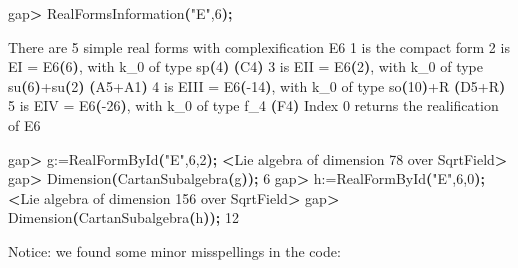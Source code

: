 \documentclass[
]{article}
\newenvironment{Shaded}{\begin{snugshade}}{\end{snugshade}}
\newcommand{\ErrorTok}[1]{\textcolor[rgb]{0.64,0.00,0.00}{\textbf{#1}}}
\newcommand{\ExtensionTok}[1]{#1}
\newcommand{\KeywordTok}[1]{\textcolor[rgb]{0.13,0.29,0.53}{\textbf{#1}}}
\newcommand{\NormalTok}[1]{#1}
\newcommand{\OperatorTok}[1]{\textcolor[rgb]{0.81,0.36,0.00}{\textbf{#1}}}
\newcommand{\StringTok}[1]{\textcolor[rgb]{0.31,0.60,0.02}{#1}}
\begin{document}
\begin{Shaded}
\begin{Highlighting}[]
\ExtensionTok{gap}\OperatorTok{\textgreater{}}\NormalTok{ RealFormsInformation}\ErrorTok{(}\StringTok{"E"}\ExtensionTok{,6}\KeywordTok{);}

  \ExtensionTok{There}\NormalTok{ are 5 simple real forms with complexification E6}
    \ExtensionTok{1}\NormalTok{ is the compact form}
    \ExtensionTok{2}\NormalTok{ is EI   = E6}\ErrorTok{(}\ExtensionTok{6}\KeywordTok{)}\ExtensionTok{,}\NormalTok{ with k\_0 of type sp}\ErrorTok{(}\ExtensionTok{4}\KeywordTok{)} \KeywordTok{(}\ExtensionTok{C4}\KeywordTok{)}
    \ExtensionTok{3}\NormalTok{ is EII  = E6}\ErrorTok{(}\ExtensionTok{2}\KeywordTok{)}\ExtensionTok{,}\NormalTok{ with k\_0 of type su}\ErrorTok{(}\ExtensionTok{6}\KeywordTok{)}\ExtensionTok{+su}\ErrorTok{(}\ExtensionTok{2}\KeywordTok{)} \KeywordTok{(}\ExtensionTok{A5+A1}\KeywordTok{)}
    \ExtensionTok{4}\NormalTok{ is EIII = E6}\ErrorTok{(}\ExtensionTok{{-}14}\KeywordTok{)}\ExtensionTok{,}\NormalTok{ with k\_0 of type so}\ErrorTok{(}\ExtensionTok{10}\KeywordTok{)}\ExtensionTok{+R} \ErrorTok{(}\ExtensionTok{D5+R}\KeywordTok{)}
    \ExtensionTok{5}\NormalTok{ is EIV  = E6}\ErrorTok{(}\ExtensionTok{{-}26}\KeywordTok{)}\ExtensionTok{,}\NormalTok{ with k\_0 of type f\_4 }\ErrorTok{(}\ExtensionTok{F4}\KeywordTok{)}
  \ExtensionTok{Index} \StringTok{\textquotesingle{}0\textquotesingle{}}\NormalTok{ returns the realification of E6}

\ExtensionTok{gap}\OperatorTok{\textgreater{}}\NormalTok{ g:=RealFormById}\ErrorTok{(}\StringTok{"E"}\ExtensionTok{,6,2}\KeywordTok{);}
\OperatorTok{\textless{}}\NormalTok{Lie }\ExtensionTok{algebra}\NormalTok{ of dimension 78 over SqrtField}\OperatorTok{\textgreater{}}
\ExtensionTok{gap}\OperatorTok{\textgreater{}}\NormalTok{ Dimension}\ErrorTok{(}\ExtensionTok{CartanSubalgebra}\ErrorTok{(}\ExtensionTok{g}\KeywordTok{));}
\ExtensionTok{6}
\ExtensionTok{gap}\OperatorTok{\textgreater{}}\NormalTok{ h:=RealFormById}\ErrorTok{(}\StringTok{"E"}\ExtensionTok{,6,0}\KeywordTok{);}
\OperatorTok{\textless{}}\NormalTok{Lie }\ExtensionTok{algebra}\NormalTok{ of dimension 156 over SqrtField}\OperatorTok{\textgreater{}}
\ExtensionTok{gap}\OperatorTok{\textgreater{}}\NormalTok{ Dimension}\ErrorTok{(}\ExtensionTok{CartanSubalgebra}\ErrorTok{(}\ExtensionTok{h}\KeywordTok{));}
\ExtensionTok{12}
\end{Highlighting}
\end{Shaded}

Notice: we found some minor misspellings in the code:
\end{document}

